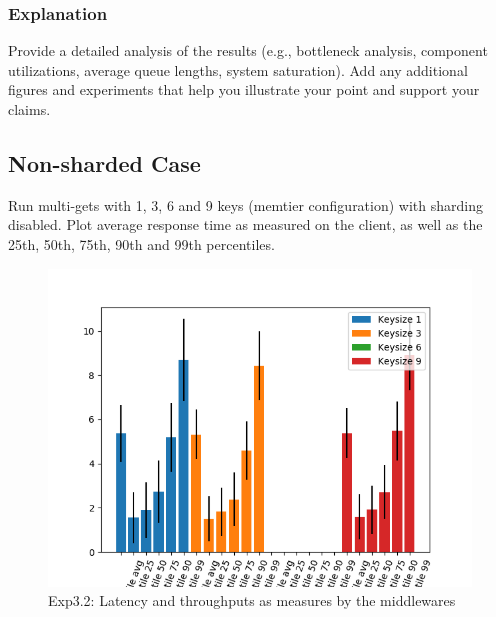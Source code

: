 \documentclass[11pt,a4paper]{article}
\begin{document}
\subsubsection{Explanation}

Provide a detailed analysis of the results (e.g., bottleneck analysis, component utilizations, average queue lengths, system saturation). Add any additional figures and experiments that help you illustrate your point and support your claims.

\subsection{Non-sharded Case}

Run multi-gets with 1, 3, 6 and 9 keys (memtier configuration) with sharding disabled. Plot average response time as measured on the client, as well as the 25th, 50th, 75th, 90th and 99th percentiles.

\begin{figure}[H]
\centering
\includegraphics[width=\textwidth]{img/exp5_1/exp5_1_percentile_plots_sharded_False.png}
\caption{Exp3.2: Latency and throughputs as measures by the middlewares}
\label{fig:test}
\end{figure}
\end{document}
